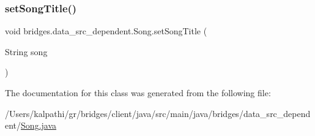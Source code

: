 \mbox{\label{classbridges_1_1data__src__dependent_1_1_song_a9d7540c0e6cca53ae3a105885aac5622}} 
\subsubsection{\texorpdfstring{set\+Song\+Title()}{setSongTitle()}}
{\footnotesize\ttfamily void bridges.\+data\+\_\+src\+\_\+dependent.\+Song.\+set\+Song\+Title (\begin{DoxyParamCaption}\item[{String}]{song }\end{DoxyParamCaption})}



The documentation for this class was generated from the following file\+:\begin{DoxyCompactItemize}
\item 
/\+Users/kalpathi/gr/bridges/client/java/src/main/java/bridges/data\+\_\+src\+\_\+dependent/\mbox{\hyperlink{_song_8java}{Song.\+java}}\end{DoxyCompactItemize}
